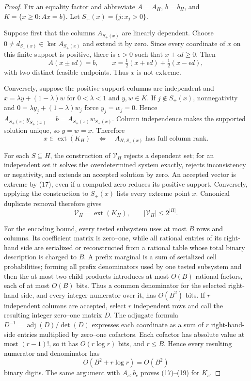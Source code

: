 \documentclass{article}
\begin{document}
\begin{proof}
Fix an equality factor and abbreviate \(A=A_H\), \(b=b_H\), and \(K=\{x\ge0:Ax=b\}\).  Let \(S_+(x)=\{j:x_j>0\}\).

Suppose first that the columns \(A_{S_+(x)}\) are linearly dependent.  Choose \(0\ne d_{S_+(x)}\in\ker A_{S_+(x)}\) and extend it by zero.  Since every coordinate of \(x\) on this finite support is positive, there is \(\epsilon>0\) such that \(x\pm\epsilon d\ge0\).  Then
\[
A(x\pm\epsilon d)=b,\qquad
x=\tfrac12(x+\epsilon d)+\tfrac12(x-\epsilon d), \tag{16}
\]
with two distinct feasible endpoints.  Thus \(x\) is not extreme.

Conversely, suppose the positive-support columns are independent and
\(x=\lambda y+(1-\lambda)w\) for \(0<\lambda<1\) and \(y,w\in K\).  If \(j\notin S_+(x)\), nonnegativity and \(0=\lambda y_j+(1-\lambda)w_j\) force \(y_j=w_j=0\).  Hence \(A_{S_+(x)}y_{S_+(x)}=b=A_{S_+(x)}w_{S_+(x)}\).  Column independence makes the supported solution unique, so \(y=w=x\).  Therefore
\[
x\in\operatorname{ext}(K_H)
\quad\Longleftrightarrow\quad
A_{H,S_+(x)}\text{ has full column rank}. \tag{17}
\]

For each \(S\subseteq H\), the construction of \(\mathcal V_H\) rejects a dependent set; for an independent set it solves the overdetermined system exactly, rejects inconsistency or negativity, and extends an accepted solution by zero.  An accepted vector is extreme by (17), even if a computed zero reduces its positive support.  Conversely, applying the construction to \(S_+(x)\) lists every extreme point \(x\).  Canonical duplicate removal therefore gives
\[
\mathcal V_H=\operatorname{ext}(K_H),\qquad
|\mathcal V_H|\le2^{|H|}. \tag{18}
\]

For the encoding bound, every tested subsystem uses at most \(B\) rows and columns.  Its coefficient matrix is zero--one, while all rational entries of its right-hand side are serialized or reconstructed from a rational table whose total binary description is charged to \(B\).  A prefix marginal is a sum of serialized cell probabilities; forming all prefix denominators used by one tested subsystem and then the at-most-two-child products introduces at most \(O(B)\) rational factors, each of at most \(O(B)\) bits.  Thus a common denominator for the selected right-hand side, and every integer numerator over it, has \(O(B^2)\) bits.  If \(r\) independent columns are accepted, select \(r\) independent rows and call the resulting integer zero--one matrix \(D\).  The adjugate formula \(D^{-1}=\operatorname{adj}(D)/\det(D)\) expresses each coordinate as a sum of \(r\) right-hand-side entries multiplied by zero--one cofactors.  Each cofactor has absolute value at most \((r-1)!\), so it has \(O(r\log r)\) bits, and \(r\le B\).  Hence every resulting numerator and denominator has
\[
O(B^2+r\log r)=O(B^2) \tag{19}
\]
binary digits.  The same argument with \(A_c,b_c\) proves (17)--(19) for \(K_c\).
\end{proof}
\end{document}

